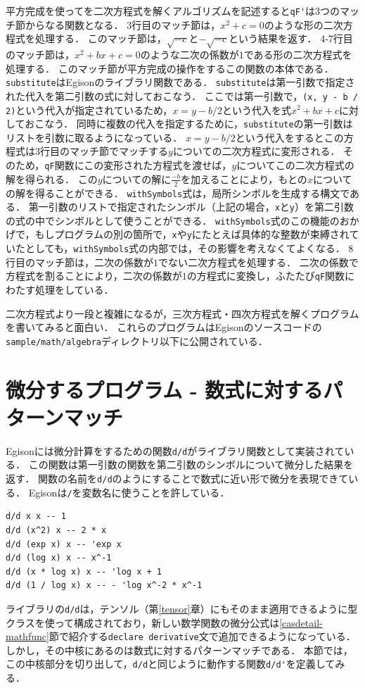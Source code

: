 平方完成を使ってを二次方程式を解くアルゴリズムを記述すると\lstinline{qF'}は3つのマッチ節からなる関数となる．
3行目のマッチ節は，$x^2 + c = 0$のような形の二次方程式を処理する．
このマッチ節は，$\sqrt{-c}$と$-\sqrt{-c}$という結果を返す．
4-7行目のマッチ節は，$x^2 + b x + c = 0$のような二次の係数が$1$である形の二次方程式を処理する．
このマッチ節が平方完成の操作をするこの関数の本体である．
\lstinline{substitute}はEgisonのライブラリ関数である．
\lstinline{substitute}は第一引数で指定された代入を第二引数の式に対しておこなう．
ここでは第一引数で，\lstinline{(x, y - b / 2)}という代入が指定されているため，$x = y - b / 2$という代入を式$x^2 + b x + c$に対しておこなう．
同時に複数の代入を指定するために，\lstinline{substitute}の第一引数はリストを引数に取るようになっている．
$x = y - b / 2$という代入をするとこの方程式は3行目のマッチ節でマッチする$y$についての二次方程式に変形される．
そのため，\lstinline{qF}関数にこの変形された方程式を渡せば，$y$についてこの二次方程式の解を得られる．
この$y$についての解に$\frac{-b}{2}$を加えることにより，もとの$x$についての解を得ることができる．
\lstinline{withSymbols}式は，局所シンボルを生成する構文である．
第一引数のリストで指定されたシンボル（上記の場合，\lstinline{x}と\lstinline{y}）を第二引数の式の中でシンボルとして使うことができる．
\lstinline{withSymbols}式のこの機能のおかげで，もしプログラムの別の箇所で，\lstinline{x}や\lstinline{y}にたとえば具体的な整数が束縛されていたとしても，\lstinline{withSymbols}式の内部では，その影響を考えなくてよくなる．
8行目のマッチ節は，二次の係数が$1$でない二次方程式を処理する．
二次の係数で方程式を割ることにより，二次の係数が$1$の方程式に変換し，ふたたび\lstinline{qF}関数にわたす処理をしている．

二次方程式より一段と複雑になるが，三次方程式・四次方程式を解くプログラムを書いてみると面白い．
これらのプログラムはEgisonのソースコードの\texttt{sample/math/algebra}ディレクトリ以下に公開されている．

\section{微分するプログラム - 数式に対するパターンマッチ}\label{cas-derivative}

Egisonには微分計算をするための関数\lstinline{d/d}がライブラリ関数として実装されている．
この関数は第一引数の関数を第二引数のシンボルについて微分した結果を返す．
関数の名前を\lstinline{d/d}のようにすることで数式に近い形で微分を表現できている．
Egisonは\lstinline{/}を変数名に使うことを許している．
\begin{lstlisting}[language=egison,numbers=none]
d/d x x -- 1
d/d (x^2) x -- 2 * x
d/d (exp x) x -- 'exp x
d/d (log x) x -- x^-1
d/d (x * log x) x -- 'log x + 1
d/d (1 / log x) x -- - 'log x^-2 * x^-1
\end{lstlisting}
ライブラリの\lstinline{d/d}は，テンソル（第\ref{tensor}章）にもそのまま適用できるように型クラスを使って構成されており，新しい数学関数の微分公式は\ref{casdetail-mathfunc}節で紹介する\lstinline{declare derivative}文で追加できるようになっている．
しかし，その中核にあるのは数式に対するパターンマッチである．
本節では，この中核部分を切り出して，\lstinline{d/d}と同じように動作する関数\lstinline{d/d'}を定義してみる．

